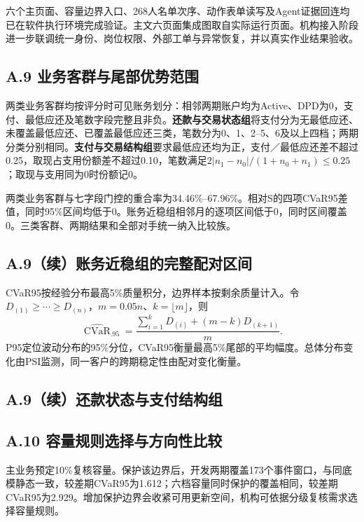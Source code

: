 六个主页面、容量边界入口、268人名单次序、动作表单读写及Agent证据回连均已在软件执行环境完成验证。主文六页面集成图取自实际运行页面。机构接入阶段进一步联调统一身份、岗位权限、外部工单与异常恢复，并以真实作业结果验收。

\clearpage\subsection*{A.9 业务客群与尾部优势范围}
两类业务客群均按评分时可见账务划分：相邻两期账户均为Active、DPD为0，支付、最低应还及笔数字段完整且非负。\textbf{还款与交易状态组}将支付分为无最低应还、未覆盖最低应还、已覆盖最低应还三类，笔数分为0、1、2--5、6及以上四档；两期分类分别相同。\textbf{支付与交易结构组}要求最低应还均为正，支付／最低应还差不超过0.25，取现占支用份额差不超过0.10，笔数满足$2|n_1-n_0|/(1+n_0+n_1)\leq0.25$；取现与支用同为0时份额记0。


两类业务客群与七字段门控的重合率为34.46\%--67.96\%。相对S的四项CVaR95差值，同时95\%区间均低于0。账务近稳组相邻月的逐项区间低于0，同时区间覆盖0。三类客群、两期结果和全部对手统一纳入比较族。

\clearpage\subsection*{A.9（续）账务近稳组的完整配对区间}

CVaR95按经验分布最高5\%质量积分，边界样本按剩余质量计入。令$D_{(1)}\geq\cdots\geq D_{(n)}$，$m=0.05n$、$k=\lfloor m\rfloor$，则
\[
\widehat{\operatorname{CVaR}}_{.95}=\frac{\sum_{i=1}^{k}D_{(i)}+(m-k)D_{(k+1)}}{m}.
\]
P95定位波动分布的95\%分位，CVaR95衡量最高5\%尾部的平均幅度。总体分布变化由PSI监测，同一客户的跨期稳定性由配对变化衡量。

\clearpage\subsection*{A.9（续）还款状态与支付结构组}



\clearpage\subsection*{A.10 容量规则选择与方向性比较}

主业务预定10\%复核容量。保护该边界后，开发两期覆盖173个事件窗口，与同底模静态一致，较差期CVaR95为1.612；六档容量同时保护的覆盖相同，较差期CVaR95为2.929。增加保护边界会收紧可用更新空间，机构可依据分级复核需求选择容量规则。

